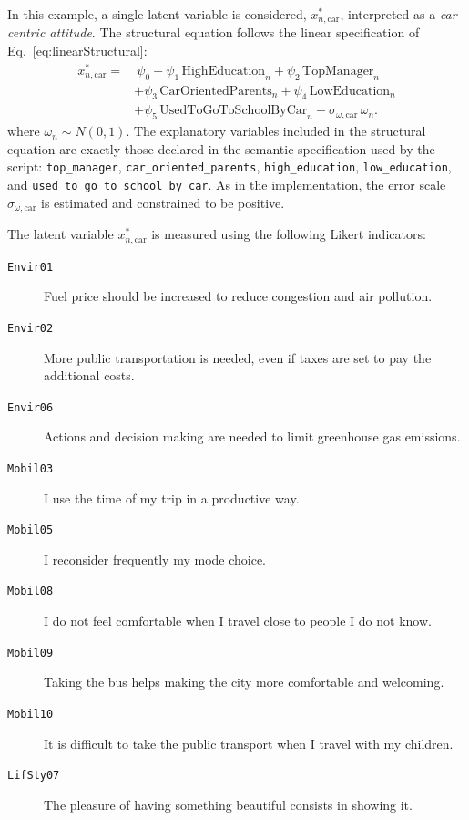 \documentclass[12pt,a4paper]{article}
\let\OrigUnderscore\_
\def\_{\OrigUnderscore\penalty0\hspace{0pt}}%
\newcommand{\highEducation}{\mathrm{HighEducation}}
\newcommand{\lowEducation}{\mathrm{LowEducation}}
\newcommand{\topManager}{\mathrm{TopManager}}
\newcommand{\carOrientedParents}{\mathrm{CarOrientedParents}}
\newcommand{\usedToGoToSchoolByCar}{\mathrm{UsedToGoToSchoolByCar}}
\begin{document}
In this example, a single latent variable is considered, $x^*_{n,\text{car}}$,
interpreted as a \emph{car-centric attitude}. The structural equation
follows the linear specification of Eq.~\eqref{eq:linearStructural}:
\begin{equation}
\label{eq:example2_structural}
\begin{aligned}
x^*_{n,\text{car}} = &\ \psi_0 + \psi_1 \, \highEducation_n + \psi_2 \,
\topManager_n  \\ &+ \psi_3 \,
\carOrientedParents_n + \psi_4 \, \lowEducation_n \\ &+ \psi_5 \,
\usedToGoToSchoolByCar_n + \sigma_{\omega,\text{car}} \, \omega_n.
\end{aligned}
\end{equation}
where \(\omega_n \sim N(0,1)\). The explanatory variables included in
the structural equation are exactly those declared in the semantic
specification used by the script: \texttt{top\_manager},
\texttt{car\_oriented\_parents},
\texttt{high\_education}, \texttt{low\_education}, and
\texttt{used\_to\_go\_to\_school\_by\_car}.  As in the implementation,
the error scale \(\sigma_{\omega,\text{car}}\) is estimated and
constrained to be positive.

The latent variable \(x^*_{n,\text{car}}\) is measured using the
following Likert indicators:

\begin{description}
\item[\texttt{Envir01}] Fuel price should be increased to reduce
congestion and air pollution.
\item[\texttt{Envir02}] More public transportation is needed, even
if taxes are set to pay the additional costs.
\item[\texttt{Envir06}] Actions and decision making are needed to
limit greenhouse gas emissions.
\item[\texttt{Mobil03}] I use the time of my trip in a productive
way.
\item[\texttt{Mobil05}] I reconsider frequently my mode choice.
\item[\texttt{Mobil08}] I do not feel comfortable when I travel
close to people I do not know.
\item[\texttt{Mobil09}] Taking the bus helps making the city more
comfortable and welcoming.
\item[\texttt{Mobil10}] It is difficult to take the public transport
when I travel with my children.
\item[\texttt{LifSty07}] The pleasure of having something beautiful
consists in showing it.
\end{description}
\end{document}
